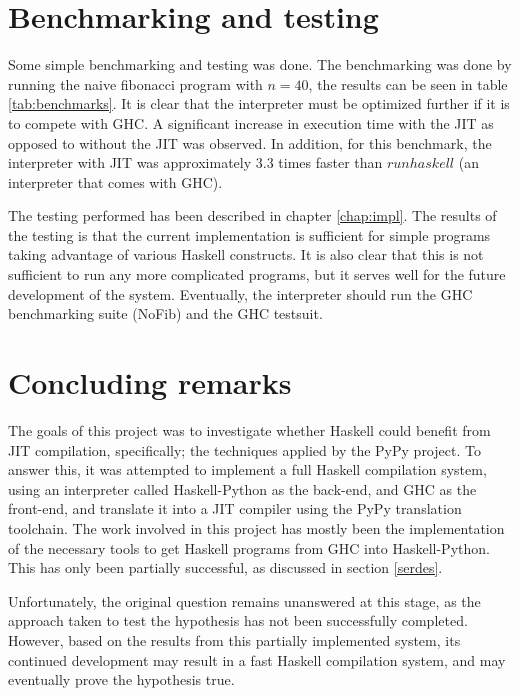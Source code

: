 \section{Benchmarking and testing}

Some simple benchmarking and testing was done. The benchmarking was done by
running the naive fibonacci program with $n=40$, the results can be seen in
table \ref{tab:benchmarks}.
It is clear that the interpreter must be optimized 
further if it is to compete with GHC. A significant increase in execution 
time with the JIT as opposed to without the JIT was observed. In addition,
for this benchmark, the interpreter with JIT was approximately $3.3$ times faster than
$runhaskell$ (an interpreter that comes with GHC).



The testing performed has been described in chapter \ref{chap:impl}. The results of the 
testing is that the current implementation is sufficient for simple programs taking 
advantage of various Haskell constructs. It is also clear that this is not sufficient
to run any more complicated programs, but it serves well for the future development of
the system. Eventually, the interpreter should run the GHC benchmarking suite (NoFib) and 
the GHC testsuit.

\section{Concluding remarks}


The goals of this project was to investigate whether Haskell could benefit from JIT 
compilation, specifically; the techniques applied by the PyPy project. 
To answer this, it was attempted to implement a full Haskell compilation
system, using an interpreter called Haskell-Python\cite{haskellpython} as the back-end,
and GHC as the front-end, and translate it into a JIT compiler using the PyPy translation
toolchain. The work involved in this project has mostly been the implementation of the necessary
tools to get Haskell programs from GHC into Haskell-Python. This has only been partially
successful, as discussed in section \ref{serdes}.

Unfortunately, the original question remains unanswered at this stage, as the
approach taken to test the hypothesis has not been successfully completed. However,
based on the results from this partially implemented system, its continued
development may result in a fast Haskell compilation system, and may eventually prove
the hypothesis true.


